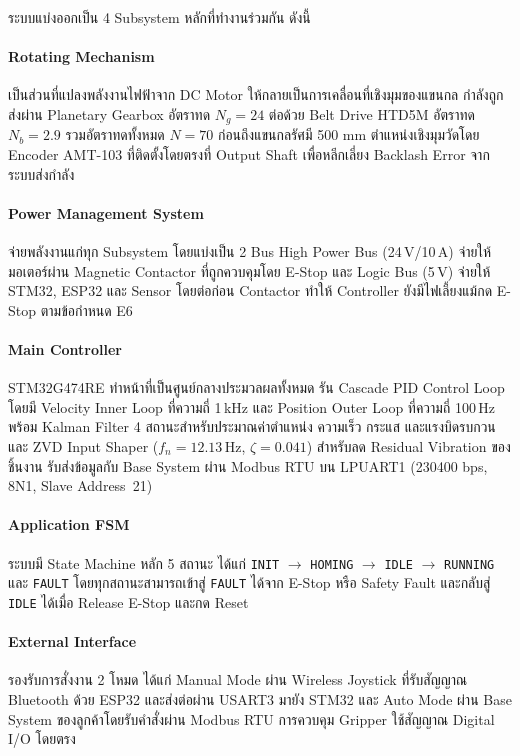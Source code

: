 ระบบแบ่งออกเป็น 4 Subsystem หลักที่ทำงานร่วมกัน ดังนี้

\paragraph{Rotating Mechanism}
เป็นส่วนที่แปลงพลังงานไฟฟ้าจาก DC Motor ให้กลายเป็นการเคลื่อนที่เชิงมุมของแขนกล
กำลังถูกส่งผ่าน Planetary Gearbox อัตราทด $N_g = 24$
ต่อด้วย Belt Drive HTD5M อัตราทด $N_b = 2.9$
รวมอัตราทดทั้งหมด $N = 70$ ก่อนถึงแขนกลรัศมี 500 mm
ตำแหน่งเชิงมุมวัดโดย Encoder AMT-103 ที่ติดตั้งโดยตรงที่ Output Shaft
เพื่อหลีกเลี่ยง Backlash Error จากระบบส่งกำลัง

\paragraph{Power Management System}
จ่ายพลังงานแก่ทุก Subsystem โดยแบ่งเป็น 2 Bus
High Power Bus (24\,V/10\,A) จ่ายให้มอเตอร์ผ่าน Magnetic Contactor
ที่ถูกควบคุมโดย E-Stop
และ Logic Bus (5\,V) จ่ายให้ STM32, ESP32 และ Sensor
โดยต่อก่อน Contactor ทำให้ Controller ยังมีไฟเลี้ยงแม้กด E-Stop
ตามข้อกำหนด E6

\paragraph{Main Controller}
STM32G474RE ทำหน้าที่เป็นศูนย์กลางประมวลผลทั้งหมด
รัน Cascade PID Control Loop โดยมี Velocity Inner Loop ที่ความถี่ 1\,kHz
และ Position Outer Loop ที่ความถี่ 100\,Hz
พร้อม Kalman Filter 4 สถานะสำหรับประมาณค่าตำแหน่ง ความเร็ว กระแส
และแรงบิดรบกวน
และ ZVD Input Shaper ($f_n = 12.13$\,Hz, $\zeta = 0.041$)
สำหรับลด Residual Vibration ของชิ้นงาน
รับส่งข้อมูลกับ Base System ผ่าน Modbus RTU บน LPUART1
(230400 bps, 8N1, Slave Address~21)

\paragraph{Application FSM}
ระบบมี State Machine หลัก 5 สถานะ ได้แก่
\texttt{INIT} $\rightarrow$ \texttt{HOMING} $\rightarrow$
\texttt{IDLE} $\rightarrow$ \texttt{RUNNING} และ \texttt{FAULT}
โดยทุกสถานะสามารถเข้าสู่ \texttt{FAULT} ได้จาก E-Stop หรือ Safety Fault
และกลับสู่ \texttt{IDLE} ได้เมื่อ Release E-Stop และกด Reset

\paragraph{External Interface}
รองรับการสั่งงาน 2 โหมด ได้แก่
Manual Mode ผ่าน Wireless Joystick ที่รับสัญญาณ Bluetooth ด้วย ESP32
และส่งต่อผ่าน USART3 มายัง STM32
และ Auto Mode ผ่าน Base System ของลูกค้าโดยรับคำสั่งผ่าน Modbus RTU
การควบคุม Gripper ใช้สัญญาณ Digital I/O โดยตรง

